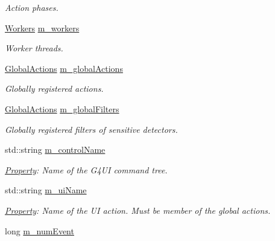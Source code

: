 \begin{DoxyCompactItemize}
\begin{DoxyCompactList}\small\item\em Action phases. \end{DoxyCompactList}\item 
\hyperlink{class_d_d4hep_1_1_simulation_1_1_geant4_kernel_ae9fdf26cda88a6f822f060558e85d797}{Workers} \hyperlink{class_d_d4hep_1_1_simulation_1_1_geant4_kernel_a8957db5b08d92dcd7b7c4ef63ea743b6}{m\+\_\+workers}
\begin{DoxyCompactList}\small\item\em Worker threads. \end{DoxyCompactList}\item 
\hyperlink{class_d_d4hep_1_1_simulation_1_1_geant4_kernel_a9cd070dfd06f049aa11b56688faaa643}{Global\+Actions} \hyperlink{class_d_d4hep_1_1_simulation_1_1_geant4_kernel_a23bac03e5a169b5fc9446e574ad034ac}{m\+\_\+global\+Actions}
\begin{DoxyCompactList}\small\item\em Globally registered actions. \end{DoxyCompactList}\item 
\hyperlink{class_d_d4hep_1_1_simulation_1_1_geant4_kernel_a9cd070dfd06f049aa11b56688faaa643}{Global\+Actions} \hyperlink{class_d_d4hep_1_1_simulation_1_1_geant4_kernel_afab7f53720ce6b7255ff54d777c4ff4e}{m\+\_\+global\+Filters}
\begin{DoxyCompactList}\small\item\em Globally registered filters of sensitive detectors. \end{DoxyCompactList}\item 
std\+::string \hyperlink{class_d_d4hep_1_1_simulation_1_1_geant4_kernel_a1019ec87b302f798f36361dd9be8b40a}{m\+\_\+control\+Name}
\begin{DoxyCompactList}\small\item\em \hyperlink{class_d_d4hep_1_1_property}{Property}\+: Name of the G4\+UI command tree. \end{DoxyCompactList}\item 
std\+::string \hyperlink{class_d_d4hep_1_1_simulation_1_1_geant4_kernel_aea869c039be9e0818e4f80afbab1e47c}{m\+\_\+ui\+Name}
\begin{DoxyCompactList}\small\item\em \hyperlink{class_d_d4hep_1_1_property}{Property}\+: Name of the UI action. Must be member of the global actions. \end{DoxyCompactList}\item 
long \hyperlink{class_d_d4hep_1_1_simulation_1_1_geant4_kernel_a5786c0e6c67534e109595f568df489a9}{m\+\_\+num\+Event}

\end{DoxyCompactItemize}
